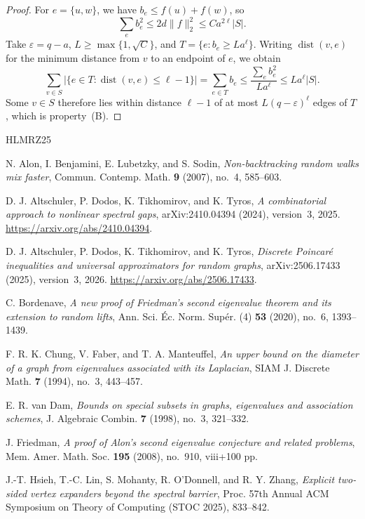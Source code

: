 \documentclass[11pt,reqno]{amsart}
\theoremstyle{definition}
\newcommand{\dist}{\operatorname{dist}}
\begin{document}
\begin{proof}
For $e=\{u,w\}$, we have $b_e\le f(u)+f(w)$, so
\[
 \sum_e b_e^2\le2d\|f\|_2^2\le C a^{2\ell}|S|.
\]
Take $\varepsilon=q-a$, $L\ge\max\{1,\sqrt C\}$, and
$T=\{e:b_e\ge La^\ell\}$.
Writing $\dist(v,e)$ for the minimum distance from $v$ to an
endpoint of $e$, we obtain
\[
 \sum_{v\in S}|\{e\in T:\dist(v,e)\le\ell-1\}|
 =\sum_{e\in T}b_e
 \le\frac{\sum_e b_e^2}{La^\ell}
 \le La^\ell|S|.
\]
Some $v\in S$ therefore lies within distance $\ell-1$ of at
most $L(q-\varepsilon)^\ell$ edges of $T$, which is property~(B).
\end{proof}

\newpage

\begin{thebibliography}{HLMRZ25}

N. Alon, I. Benjamini, E. Lubetzky, and S. Sodin,
\emph{Non-backtracking random walks mix faster},
Commun. Contemp. Math. \textbf{9} (2007), no.~4, 585--603.

D. J. Altschuler, P. Dodos, K. Tikhomirov, and K. Tyros,
\emph{A combinatorial approach to nonlinear spectral gaps},
arXiv:2410.04394 (2024), version~3, 2025.
\url{https://arxiv.org/abs/2410.04394}.

D. J. Altschuler, P. Dodos, K. Tikhomirov, and K. Tyros,
\emph{Discrete Poincar\'e inequalities and universal approximators for random graphs},
arXiv:2506.17433 (2025), version~3, 2026.
\url{https://arxiv.org/abs/2506.17433}.

C. Bordenave,
\emph{A new proof of Friedman's second eigenvalue theorem and its extension to random lifts},
Ann. Sci. \'Ec. Norm. Sup\'er. (4) \textbf{53} (2020), no.~6, 1393--1439.

F. R. K. Chung, V. Faber, and T. A. Manteuffel,
\emph{An upper bound on the diameter of a graph from eigenvalues associated with its Laplacian},
SIAM J. Discrete Math. \textbf{7} (1994), no.~3, 443--457.

E. R. van Dam,
\emph{Bounds on special subsets in graphs, eigenvalues and association schemes},
J. Algebraic Combin. \textbf{7} (1998), no.~3, 321--332.

J. Friedman,
\emph{A proof of Alon's second eigenvalue conjecture and related problems},
Mem. Amer. Math. Soc. \textbf{195} (2008), no.~910, viii+100 pp.

J.-T. Hsieh, T.-C. Lin, S. Mohanty, R. O'Donnell, and R. Y. Zhang,
\emph{Explicit two-sided vertex expanders beyond the spectral barrier},
Proc. 57th Annual ACM Symposium on Theory of Computing (STOC 2025), 833--842.


\end{thebibliography}
\end{document}
